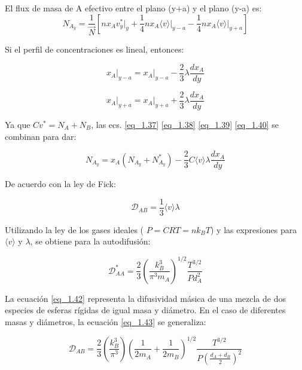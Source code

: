         
        El flux de masa de A efectivo entre el plano (y+a) y el plano (y-a) es:
        \begin{equation}
N_{A_{y}} = \frac{1}{\vec{N}} \left[ n x_A  v_y^* \bigg|_{y} + \frac{1}{4}n x_A \langle v \rangle \bigg|_{y-a}- \frac{1}{4} nx_A\langle v \rangle \bigg|_{y+a} \right]
\tag{1.38} \label{eq_1.38}
\end{equation}

Si el perfil de concentraciones es lineal, entonces:

\begin{equation}
x_A \bigg|_{y-a} = x_A \bigg|_{y-a} - \frac{2}{3}\lambda \frac{dx_A}{dy}
\tag{1.39} \label{eq_1.39}
\end{equation}

\begin{equation}
x_A \bigg|_{y+a} = x_A \bigg|_{y+a} + \frac{2}{3}\lambda \frac{dx_A}{dy}
\tag{1.40} \label{eq_1.40}
\end{equation}

Ya que \( Cv^* = N_A + N_B \), las ecs. \ref{eq_1.37} \ref{eq_1.38} \ref{eq_1.39} \ref{eq_1.40} se combinan para dar:

\begin{equation}
N_{A_{y}} = x_A \left( N_{A_y} + N_{A_y}^* \right) - \frac{2}{3}C \langle v \rangle \lambda \frac{dx_A}{dy} \tag{1.41}\label{eq_1.41}
\end{equation}

De acuerdo con la ley de Fick:

\begin{equation}
\mathscr{D}_{AB} = \frac{1}{3} \langle v \rangle \lambda  \tag{1.42}\label{eq_1.42}
\end{equation}

Utilizando la ley de los gases ideales ( $P = CRT = nk_BT $) y las expresiones para \( \langle v \rangle \) y \( \lambda \), se obtiene para la autodifusión:

\begin{equation}
\mathscr{D}_{AA}^* = \frac{2}{3} \left( \frac{k_B^3}{\pi^3 m_A} \right)^{1/2} \frac{T^{3/2}}{P d_A^2}\tag{1.43}\label{eq_1.43}
\end{equation}

La ecuación \ref{eq_1.42} representa la difusividad másica de una mezcla de dos especies de esferas rígidas de igual masa y diámetro. En el caso de diferentes masas y diámetros, la ecuación \ref{eq_1.43} se generaliza:

\begin{equation}
\mathscr{D}_{AB} = \frac{2}{3} \left( \frac{k_B^3}{\pi^3} \right) \left( \frac{1}{2 m_A} + \frac{1}{2 m_B} \right)^{1/2} \frac{T^{3/2}}{P \left( \frac{d_A + d_B}{2} \right)^2}\tag{1.44}\label{eq_1.44}
\end{equation}

